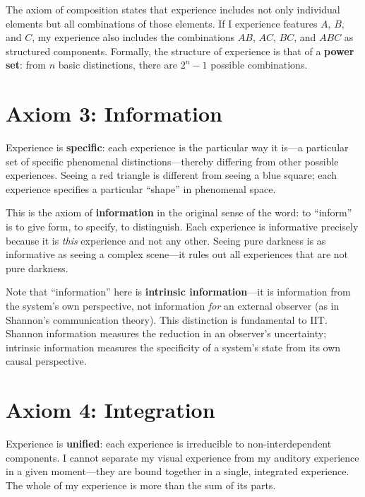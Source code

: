 \documentclass[11pt,a4paper]{report}
\begin{document}
The axiom of composition states that experience includes not only individual elements but all combinations of those elements. If I experience features $A$, $B$, and $C$, my experience also includes the combinations $AB$, $AC$, $BC$, and $ABC$ as structured components. Formally, the structure of experience is that of a \textbf{power set}: from $n$ basic distinctions, there are $2^n - 1$ possible combinations.

\section{Axiom 3: Information}

\begin{axiombox}
Experience is \textbf{specific}: each experience is the particular way it is---a particular set of specific phenomenal distinctions---thereby differing from other possible experiences. Seeing a red triangle is different from seeing a blue square; each experience specifies a particular ``shape'' in phenomenal space.
\end{axiombox}

This is the axiom of \textbf{information} in the original sense of the word: to ``inform'' is to give form, to specify, to distinguish. Each experience is informative precisely because it is \emph{this} experience and not any other. Seeing pure darkness is as informative as seeing a complex scene---it rules out all experiences that are not pure darkness.

Note that ``information'' here is \textbf{intrinsic information}---it is information from the system's own perspective, not information \emph{for} an external observer (as in Shannon's communication theory). This distinction is fundamental to IIT. Shannon information measures the reduction in an observer's uncertainty; intrinsic information measures the specificity of a system's state from its own causal perspective.

\section{Axiom 4: Integration}

\begin{axiombox}
Experience is \textbf{unified}: each experience is irreducible to non-interdependent components. I cannot separate my visual experience from my auditory experience in a given moment---they are bound together in a single, integrated experience. The whole of my experience is more than the sum of its parts.
\end{axiombox}
\end{document}

